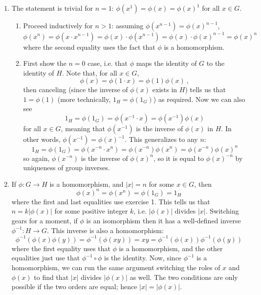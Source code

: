 \documentclass[]{article}
\newcommand{\abs}[1]{\left\vert #1 \right\vert}
\begin{document}
\begin{enumerate}

\item The statement is trivial for $n=1$: $\phi(x^1) = \phi(x) = \phi(x)^1$ for all $x \in G$.
\begin{enumerate}
\item Proceed inductively for $n>1$: assuming $\phi(x^{n-1}) = \phi(x)^{n-1}$,
\begin{equation}
\phi(x^n) = \phi(x \cdot x^{n-1}) = \phi(x)\cdot\phi(x^{n-1}) = \phi(x)\cdot \phi(x)^{n-1} = \phi(x)^n
\end{equation}
where the second equality uses the fact that $\phi$ is a homomorphism.

\item First show the $n=0$ case, i.e. that $\phi$ maps the identity of $G$ to the identity of $H$. Note that, for all $x \in G$, 
\begin{equation}
\phi(x) = \phi(1\cdot x) = \phi(1)\phi(x)\ ,
\end{equation}
then canceling (since the inverse of $\phi(x)$ exists in $H$) tells us that $1 = \phi(1)$ (more technically, $1_H = \phi(1_G)$) as required. Now we can also see
\begin{equation}
1_H = \phi(1_G) = \phi(x^{-1}\cdot x) = \phi(x^{-1})\phi(x)
\end{equation}
for all $x \in G$, meaning that $\phi(x^{-1})$ is the inverse of $\phi(x)$ in $H$. In other words, $\phi(x^{-1}) = \phi(x)^{-1}$. This generalizes to any $n$:
\begin{equation}
1_H = \phi(1_G) = \phi(x^{-n}\cdot x^n) = \phi(x^{-n})\phi(x^n) = \phi(x^{-n})\phi(x)^n 
\end{equation} 
so again, $\phi(x^{-n})$ is the inverse of $\phi(x)^n$, so it is equal to $\phi(x)^{-n}$ by uniqueness of group inverses.
\end{enumerate}


\item If $\phi: G\to H$ is a homomorphism, and $\abs{x} = n$ for some $x\in G$, then 
\begin{equation}
\phi(x)^n = \phi(x^n) = \phi(1_G) = 1_H
\end{equation}
where the first and last equalities use exercise 1. This tells us that $n = k\abs{\phi(x)}$ for some positive integer $k$, i.e. $\abs{\phi(x)}$ divides $\abs{x}$. Switching gears for a moment, if $\phi$ is an isomorphism then it has a well-defined inverse $\phi^{-1}: H \to G$. This inverse is also a homomorphism:
\begin{equation}
\phi^{-1}(\phi(x)\phi(y)) = \phi^{-1}(\phi(xy)) = xy = \phi^{-1}(\phi(x))\phi^{-1}(\phi(y))
\end{equation}
where the first equality uses that $\phi$ is a homomorphism, and the other equalities just use that $\phi^{-1}\circ \phi$ is the identity. Now, since $\phi^{-1}$ is a homomorphism, we can run the same argument switching the roles of $x$ and $\phi(x)$ to find that $\abs{x}$ divides $\abs{\phi(x)}$ as well. The two conditions are only possible if the two orders are equal; hence $\abs{x} = \abs{\phi(x)}$. \\


\end{enumerate}
\end{document}
